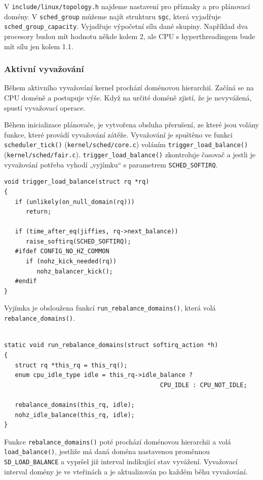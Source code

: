 \documentclass[a4paper,12pt]{article}
\begin{document}
V \verb#include/linux/topology.h# najdeme nastavení pro příznaky a pro plánovací domény. V \verb#sched_group# můžeme najít strukturu \verb#sgc#, která vyjadřuje \verb#sched_group_capacity#. Vyjadřuje výpočetní sílu dané skupiny. Například dva procesory budou mít hodnotu někde kolem 2, ale CPU s hyperthreadingem bude mít sílu jen kolem 1.1. 

\subsubsection{Aktivní vyvažování}

Během aktivního vyvažování kernel prochází doménovou hierarchií. Začíná se na CPU doméně a postupuje výše. Když na určité doméně zjistí, že je nevyvážená, spustí vyvažovací operace.

Během inicializace plánovače, je vytvořena obsluha přerušení, ze které jsou volány funkce, které provádí vyvažování zátěže. Vyvažování je spuštěno ve funkci \verb#scheduler_tick()# (\verb#kernel/sched/core.c#) voláním \linebreak \verb#trigger_load_balance()# (\verb#kernel/sched/fair.c#). \verb#trigger_load_balance()# zkontroluje časovač a jestli je vyvažování potřeba vyhodí „vyjímku“ s parametrem \verb#SCHED_SOFTIRQ#.

\begin{verbatim} 
void trigger_load_balance(struct rq *rq)
{
   if (unlikely(on_null_domain(rq)))
      return;

   if (time_after_eq(jiffies, rq->next_balance))
      raise_softirq(SCHED_SOFTIRQ);
   #ifdef CONFIG_NO_HZ_COMMON
      if (nohz_kick_needed(rq))
         nohz_balancer_kick();
   #endif
}
\end{verbatim} 

Vyjímka je obsloužena funkcí \verb#run_rebalance_domains()#, která volá \linebreak \verb#rebalance_domains()#. 

\begin{verbatim} 

static void run_rebalance_domains(struct softirq_action *h)
{
   struct rq *this_rq = this_rq();
   enum cpu_idle_type idle = this_rq->idle_balance ?
                                           CPU_IDLE : CPU_NOT_IDLE;

   rebalance_domains(this_rq, idle);
   nohz_idle_balance(this_rq, idle);
}

\end{verbatim} 

Funkce \verb#rebalance_domains()# poté prochází doménovou hierarchii a volá \verb#load_balance()#, jestliže má daná doména nastavenou proměnnou \verb#SD_LOAD_BALANCE# a vypršel již interval indikující stav vyvážení. Vyvažovací interval domény je ve vteřinách a je aktualizován po každém běhu vyvažování.
\end{document}
